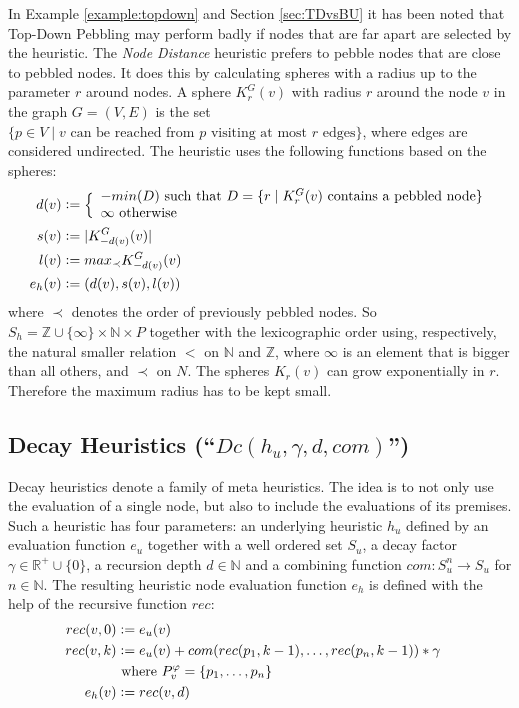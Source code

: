 In Example \ref{example:topdown} and Section \ref{sec:TDvsBU} it has been noted that Top-Down Pebbling may perform badly if nodes that are far apart are selected by the heuristic.
The \emph{Node Distance} heuristic prefers to pebble nodes that are close to pebbled nodes. It does this by calculating spheres with a radius up to the parameter $r$ around nodes.
A sphere $K_r^{G}(v)$ with radius $r$ around the node $v$ in the graph $G = (V,E)$ is the set $\{p \in V \mid v \text{ can be reached from } p \text{ visiting at most } r \text{ edges}\}$, where edges are considered undirected. 
The heuristic uses the following functions based on the spheres:
\begin{align*}
	d(v) &\mathrel{\mathop:}= \Big\{
	\begin{array}{l}
		-min(D) \text{ such that } D = \{r \mid K_r^{G}(v)\text{ contains a pebbled node}\}\\
		\infty \text{ otherwise}
		\end{array}\\
	s(v) &\mathrel{\mathop:}= |K_{-d(v)}^G(v)|\\
	l(v) &\mathrel{\mathop:}= max_{\prec}K_{-d(v)}^G(v)\\
	e_h(v) &\mathrel{\mathop:}= (d(v),s(v),l(v))
\end{align*}
where $\prec$ denotes the order of previously pebbled nodes.
So $S_h = \mathbb{Z} \cup \{\infty\} \times \mathbb{N} \times P$ together with the lexicographic order using, respectively, the natural smaller relation $<$ on $\mathbb{N}$ and $\mathbb{Z}$, where $\infty$ is an element that is bigger than all others, and $\prec$ on $N$. The spheres $K_r(v)$ can grow exponentially in $r$. Therefore the maximum radius has to be kept small.

\subsection{Decay Heuristics (``$Dc(h_u,\gamma,d,com)$'') }
\label{sec:decay}
Decay heuristics denote a family of meta heuristics. 
The idea is to not only use the evaluation of a single node, but also to include the evaluations of its premises.
Such a heuristic has four parameters: an underlying heuristic $h_u$ defined by an evaluation function $e_u$ together with a well ordered set $S_u$, a decay factor $\gamma \in \mathbb{R}^+ \cup \{0\}$, a recursion depth $d \in \mathbb{N}$ and a combining function $com: S_u^n \rightarrow S_u$ for $n \in \mathbb{N}$.
The resulting heuristic node evaluation function $e_h$ is defined with the help of the recursive function $rec$:
\begin{align*}
	rec(v,0) &\mathrel{\mathop:}= e_u(v) \\
	rec(v,k) &\mathrel{\mathop:}= e_u(v) + com(rec(p_1,k-1),\ldots,rec(p_n,k-1)) * \gamma\\
	& \text{ where } P_{v}^{\varphi} = \{p_1,\ldots,p_n\}\\
	e_h(v) &\mathrel{\mathop:}= rec(v,d) &
\end{align*}


